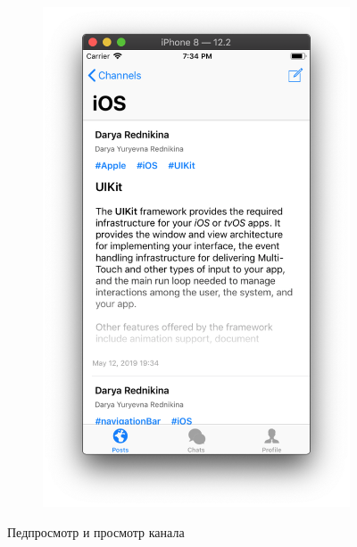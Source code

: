 \documentclass[a4paper,12pt]{article}
\begin{document}
\begin{figure}[h!]
\begin{subfigure}[b]{0.3\linewidth}
			\includegraphics[width=\linewidth]{../includes/pmi/ios_channel.png}
		\end{subfigure}
		\caption{Педпросмотр и просмотр канала}
	\end{figure}
	\clearpage
\end{document}
